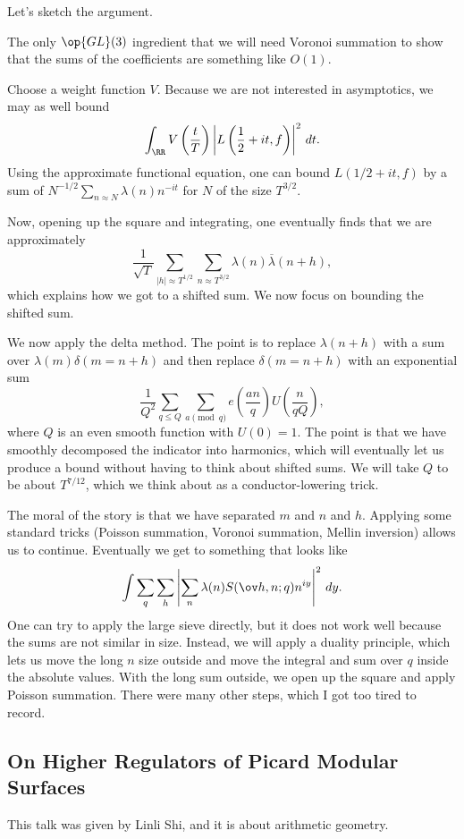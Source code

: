 \documentclass{article}
\begin{document}
Let's sketch the argument.
\begin{remark}
	The only $\op{GL}(3)$ ingredient that we will need Voronoi summation to show that the sums of the coefficients are something like $O(1)$.
\end{remark}
Choose a weight function $V$. Because we are not interested in asymptotics, we may as well bound
\[\int_\RR V\left(\frac tT\right)\left|L\left(\frac12+it,f\right)\right|^2\,dt.\]
Using the approximate functional equation, one can bound $L(1/2+it,f)$ by a sum of $N^{-1/2}\sum_{n\approx N}\lambda(n)n^{-it}$
for $N$ of the size $T^{3/2}$.

Now, opening up the square and integrating, one eventually finds that we are approximately
\[\frac1{\sqrt T}\sum_{\left|h\right|\approx T^{1/2}}\sum_{n\approx T^{3/2}}\lambda(n)\overline\lambda(n+h),\]
which explains how we got to a shifted sum. We now focus on bounding the shifted sum.

We now apply the delta method. The point is to replace $\lambda(n+h)$ with a sum over $\lambda(m)\delta(m=n+h)$ and then replace $\delta(m=n+h)$ with an exponential sum
\[\frac1{Q^2}\sum_{q\le Q}\sum_{a\pmod q}e\left(\frac{an}q\right)U\left(\frac n{qQ}\right),\]
where $Q$ is an even smooth function with $U(0)=1$.
The point is that we have smoothly decomposed the indicator into harmonics, which will eventually let us produce a bound without having to think about shifted sums. We will take $Q$ to be about $T^{7/12}$, which we think about as a conductor-lowering trick.

The moral of the story is that we have separated $m$ and $n$ and $h$. Applying some standard tricks (Poisson summation, Voronoi summation, Mellin inversion) allows us to continue. Eventually we get to something that looks like
\[\int\sum_q\sum_h\left|\sum_{n}\lambda(n)S(\ov h,n;q)n^{iy}\right|^2\,dy.\]
One can try to apply the large sieve directly, but it does not work well because the sums are not similar in size.
Instead, we will apply a duality principle, which lets us move the long $n$ size outside and move the integral and sum over $q$ inside the absolute values.
With the long sum outside, we open up the square and apply Poisson summation.
There were many other steps, which I got too tired to record.

\subsection{On Higher Regulators of Picard Modular Surfaces}
This talk was given by Linli Shi, and it is about arithmetic geometry.
\end{document}
